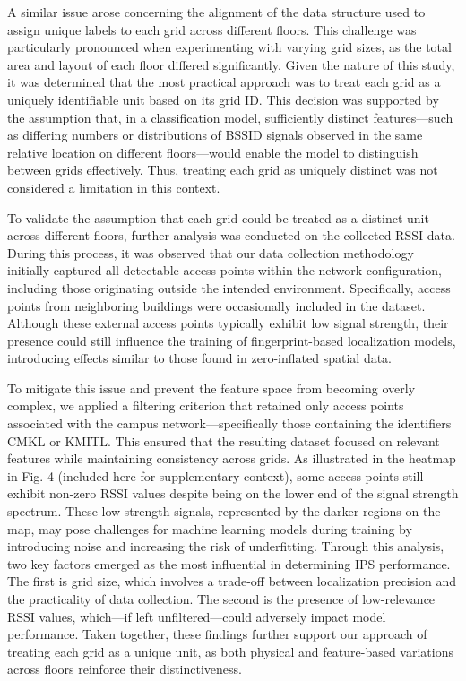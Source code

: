 \documentclass[conference]{IEEEtran}
\begin{document}
	A similar issue arose concerning the alignment of the data structure used to assign unique labels to each grid across different floors. This challenge was particularly pronounced when experimenting with varying grid sizes, as the total area and layout of each floor differed significantly. Given the nature of this study, it was determined that the most practical approach was to treat each grid as a uniquely identifiable unit based on its grid ID. This decision was supported by the assumption that, in a classification model, sufficiently distinct features—such as differing numbers or distributions of BSSID signals observed in the same relative location on different floors—would enable the model to distinguish between grids effectively. Thus, treating each grid as uniquely distinct was not considered a limitation in this context.
	
	To validate the assumption that each grid could be treated as a distinct unit across different floors, further analysis was conducted on the collected RSSI data. During this process, it was observed that our data collection methodology initially captured all detectable access points within the network configuration, including those originating outside the intended environment. Specifically, access points from neighboring buildings were occasionally included in the dataset. Although these external access points typically exhibit low signal strength, their presence could still influence the training of fingerprint-based localization models, introducing effects similar to those found in zero-inflated spatial data.
	
	To mitigate this issue and prevent the feature space from becoming overly complex, we applied a filtering criterion that retained only access points associated with the campus network—specifically those containing the identifiers CMKL or KMITL. This ensured that the resulting dataset focused on relevant features while maintaining consistency across grids.
	As illustrated in the heatmap in Fig. 4 (included here for supplementary context), some access points still exhibit non-zero RSSI values despite being on the lower end of the signal strength spectrum. These low-strength signals, represented by the darker regions on the map, may pose challenges for machine learning models during training by introducing noise and increasing the risk of underfitting.
	Through this analysis, two key factors emerged as the most influential in determining IPS performance. The first is grid size, which involves a trade-off between localization precision and the practicality of data collection. The second is the presence of low-relevance RSSI values, which—if left unfiltered—could adversely impact model performance. Taken together, these findings further support our approach of treating each grid as a unique unit, as both physical and feature-based variations across floors reinforce their distinctiveness.
	
\end{document}
